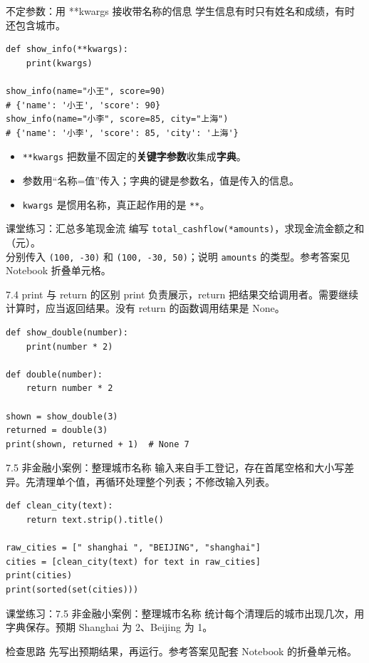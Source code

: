 \documentclass[9pt]{ctexbeamer}
\begin{document}
\begin{frame}[fragile]{不定参数：用 **kwargs 接收带名称的信息}
学生信息有时只有姓名和成绩，有时还包含城市。
\begin{lstlisting}
def show_info(**kwargs):
    print(kwargs)

show_info(name="小王", score=90)
# {'name': '小王', 'score': 90}
show_info(name="小李", score=85, city="上海")
# {'name': '小李', 'score': 85, 'city': '上海'}
\end{lstlisting}
\begin{itemize}
\item \texttt{**kwargs} 把数量不固定的\textbf{关键字参数}收集成\textbf{字典}。
\item 参数用“名称=值”传入；字典的键是参数名，值是传入的信息。
\item \texttt{kwargs} 是惯用名称，真正起作用的是 \texttt{**}。
\end{itemize}
\begin{exampleblock}{课堂练习：汇总多笔现金流}
编写 \texttt{total\_cashflow(*amounts)}，求现金流金额之和（元）。\\
分别传入 \texttt{(100, -30)} 和 \texttt{(100, -30, 50)}；说明 \texttt{amounts} 的类型。参考答案见 Notebook 折叠单元格。
\end{exampleblock}
\end{frame}

\begin{frame}[fragile]{7.4 print 与 return 的区别}
\small print 负责展示，return 把结果交给调用者。需要继续计算时，应当返回结果。没有 return 的函数调用结果是 None。
\medskip
\begin{lstlisting}
def show_double(number):
    print(number * 2)

def double(number):
    return number * 2

shown = show_double(3)
returned = double(3)
print(shown, returned + 1)  # None 7
\end{lstlisting}
\end{frame}

\begin{frame}[fragile]{7.5 非金融小案例：整理城市名称}
\small 输入来自手工登记，存在首尾空格和大小写差异。先清理单个值，再循环处理整个列表；不修改输入列表。
\medskip
\begin{lstlisting}
def clean_city(text):
    return text.strip().title()

raw_cities = [" shanghai ", "BEIJING", "shanghai"]
cities = [clean_city(text) for text in raw_cities]
print(cities)
print(sorted(set(cities)))
\end{lstlisting}
\end{frame}
\begin{frame}[fragile]{课堂练习：7.5 非金融小案例：整理城市名称}
统计每个清理后的城市出现几次，用字典保存。预期 Shanghai 为 2、Beijing 为 1。
\medskip
\begin{block}{检查思路}
先写出预期结果，再运行。参考答案见配套 Notebook 的折叠单元格。
\end{block}
\end{frame}
\end{document}
